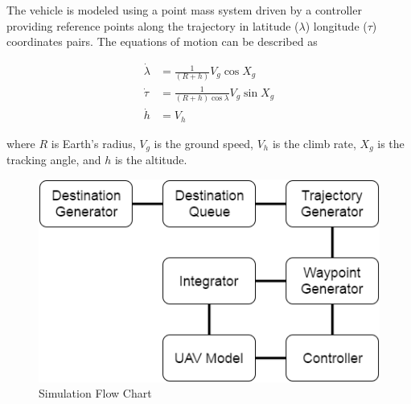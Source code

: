 The vehicle is modeled using a point mass system driven by a controller providing reference points along the trajectory in latitude ($\lambda$) longitude ($\tau$) coordinates pairs. The equations of motion can be described as 


\begin{align}
\dot{\lambda} &= \frac{1}{(R+h)}V_{g}\cos{\textit{X}_{g}} \\
\dot{\tau} &= \frac{1}{(R+h)\cos{\lambda}}V_{g}\sin{\textit{X}_{g}} \\
\dot{h} &= V_{h}
\end{align}

\vspace{5mm}
where $R$ is Earth's radius, $V_{g}$ is the ground speed, $V_{h}$ is the climb rate, $\textit{X}_{g}$ is the tracking angle, and $h$ is the altitude.

\vspace{10mm}

\begin{figure}
\includegraphics[width=1\linewidth]{images/TopLevelDesign.png}
\caption{Simulation Flow Chart}
\end{figure}


